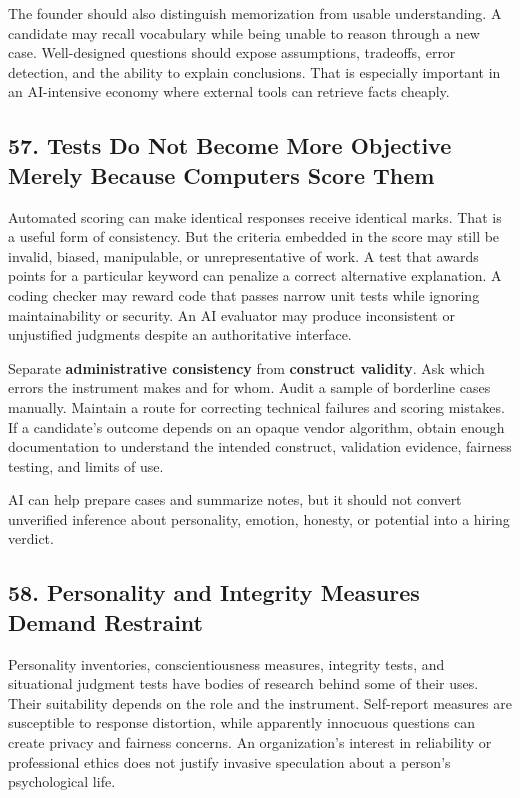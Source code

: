 The founder should also distinguish memorization from usable understanding. A candidate may recall vocabulary while being unable to reason through a new case. Well-designed questions should expose assumptions, tradeoffs, error detection, and the ability to explain conclusions. That is especially important in an AI-intensive economy where external tools can retrieve facts cheaply.

\subsection*{57. Tests Do Not Become More Objective Merely Because Computers Score Them}

Automated scoring can make identical responses receive identical marks. That is a useful form of consistency. But the criteria embedded in the score may still be invalid, biased, manipulable, or unrepresentative of work. A test that awards points for a particular keyword can penalize a correct alternative explanation. A coding checker may reward code that passes narrow unit tests while ignoring maintainability or security. An AI evaluator may produce inconsistent or unjustified judgments despite an authoritative interface.

Separate \textbf{administrative consistency} from \textbf{construct validity}. Ask which errors the instrument makes and for whom. Audit a sample of borderline cases manually. Maintain a route for correcting technical failures and scoring mistakes. If a candidate's outcome depends on an opaque vendor algorithm, obtain enough documentation to understand the intended construct, validation evidence, fairness testing, and limits of use.

AI can help prepare cases and summarize notes, but it should not convert unverified inference about personality, emotion, honesty, or potential into a hiring verdict.

\subsection*{58. Personality and Integrity Measures Demand Restraint}

Personality inventories, conscientiousness measures, integrity tests, and situational judgment tests have bodies of research behind some of their uses. Their suitability depends on the role and the instrument. Self-report measures are susceptible to response distortion, while apparently innocuous questions can create privacy and fairness concerns. An organization's interest in reliability or professional ethics does not justify invasive speculation about a person's psychological life.

